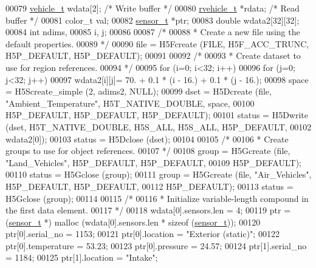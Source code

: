 \begin{DoxyCode}
00079     \hyperlink{structvehicle__t}{vehicle\_t}   wdata[2];                   \textcolor{comment}{/* Write buffer */}
00080     \hyperlink{structrvehicle__t}{rvehicle\_t}  *rdata;                     \textcolor{comment}{/* Read buffer */}
00081     color\_t     val;
00082     \hyperlink{structsensor__t}{sensor\_t}    *ptr;
00083     \textcolor{keywordtype}{double}      wdata2[32][32];
00084     \textcolor{keywordtype}{int}         ndims,
00085                 i, j;
00086 
00087     \textcolor{comment}{/*}
00088 \textcolor{comment}{     * Create a new file using the default properties.}
00089 \textcolor{comment}{     */}
00090     file = H5Fcreate (FILE, H5F\_ACC\_TRUNC, H5P\_DEFAULT, H5P\_DEFAULT);
00091 
00092     \textcolor{comment}{/*}
00093 \textcolor{comment}{     * Create dataset to use for region references.}
00094 \textcolor{comment}{     */}
00095     \textcolor{keywordflow}{for} (i=0; i<32; i++)
00096         \textcolor{keywordflow}{for} (j=0; j<32; j++)
00097             wdata2[i][j]= 70. + 0.1 * (i - 16.) + 0.1 * (j - 16.);
00098     space = H5Screate\_simple (2, adims2, NULL);
00099     dset = H5Dcreate (file, \textcolor{stringliteral}{"Ambient\_Temperature"}, H5T\_NATIVE\_DOUBLE, space,
00100                 H5P\_DEFAULT, H5P\_DEFAULT, H5P\_DEFAULT);
00101     status = H5Dwrite (dset, H5T\_NATIVE\_DOUBLE, H5S\_ALL, H5S\_ALL, H5P\_DEFAULT,
00102                 wdata2[0]);
00103     status = H5Dclose (dset);
00104 
00105     \textcolor{comment}{/*}
00106 \textcolor{comment}{     * Create groups to use for object references.}
00107 \textcolor{comment}{     */}
00108     group = H5Gcreate (file, \textcolor{stringliteral}{"Land\_Vehicles"}, H5P\_DEFAULT, H5P\_DEFAULT,
00109                 H5P\_DEFAULT);
00110     status = H5Gclose (group);
00111     group = H5Gcreate (file, \textcolor{stringliteral}{"Air\_Vehicles"}, H5P\_DEFAULT, H5P\_DEFAULT,
00112                 H5P\_DEFAULT);
00113     status = H5Gclose (group);
00114 
00115     \textcolor{comment}{/*}
00116 \textcolor{comment}{     * Initialize variable-length compound in the first data element.}
00117 \textcolor{comment}{     */}
00118     wdata[0].sensors.len = 4;
00119     ptr = (\hyperlink{structsensor__t}{sensor\_t} *) malloc (wdata[0].sensors.len * sizeof (\hyperlink{structsensor__t}{sensor\_t}));
00120     ptr[0].serial\_no = 1153;
00121     ptr[0].location = \textcolor{stringliteral}{"Exterior (static)"};
00122     ptr[0].temperature = 53.23;
00123     ptr[0].pressure = 24.57;
00124     ptr[1].serial\_no = 1184;
00125     ptr[1].location = \textcolor{stringliteral}{"Intake"};

\end{DoxyCode}
